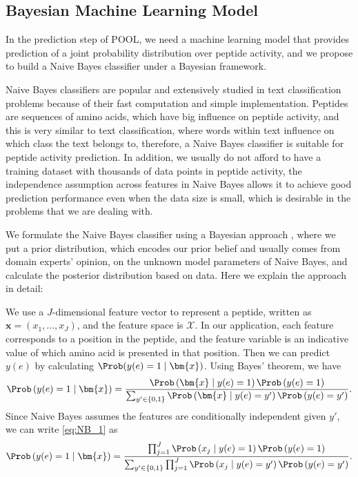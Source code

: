 \subsection{Bayesian Machine Learning Model} \label{sec:stat model}

In the prediction step of POOL, we need a machine learning model that provides prediction of a joint probability distribution over peptide activity, and we propose to build a Naive Bayes classifier under a Bayesian framework. 

Naive Bayes classifiers \citep{lewis1994sequential, mccallum1998comparison} are popular and extensively studied in text classification problems because of their fast computation and simple implementation.
Peptides are sequences of amino acids, which have big influence on peptide activity, and this is very similar to text classification, where words within text influence on which class the text belongs to, therefore, a Naive Bayes classifier is suitable for peptide activity prediction. 
In addition, we usually do not afford to have a training dataset with thousands of data points in peptide activity, the independence assumption across features in Naive Bayes allows it to achieve good prediction performance even when the data size is small, which is desirable in the problems that we are dealing with.

We formulate the Naive Bayes classifier using a Bayesian approach , where we put a prior distribution, which encodes our prior belief and usually comes from domain experts' opinion, on the unknown model parameters of Naive Bayes, and calculate the posterior distribution based on data. Here we explain the approach in detail:

We use a $J$-dimensional feature vector to represent a peptide, written as $\bm{x} = (x_1, \ldots, x_J)$, and the feature space is $\mathcal{X}$.
In our application, each feature corresponds to a position in the peptide, and the feature variable is an indicative value of which amino acid is presented in that position.
Then we can predict $y(e)$ by calculating $\Prob (y(e) = 1 \mid \bm{x})$. Using Bayes' theorem, we have
\begin{equation}
  \Prob\left( y(e) = 1 \mid \bm{x} \right) = \frac{\Prob \left( \bm{x} \mid y(e) = 1 \right) \Prob \left(y(e) = 1 \right)}{\sum_{y' \in \{0, 1\}} \Prob \left(\bm{x} \mid y(e) = y' \right) \Prob \left( y(e) = y' \right)}.
  \label{eq:NB_1}
\end{equation}
Since Naive Bayes assumes the features are conditionally independent given $y'$, we can write \eqref{eq:NB_1} as 
\begin{equation}
  \Prob \left( y(e) = 1 \mid \bm{x} \right) = \frac{\prod_{j = 1}^J \Prob \left( x_j \mid y(e) = 1 \right) \Prob \left( y(e) = 1 \right)}{\sum_{y' \in \{0, 1\}} \prod_{j = 1}^J \Prob \left( x_j \mid y(e) = y' \right) \Prob \left( y(e) = y' \right)}.
  \label{eq:NB_2}
\end{equation}


